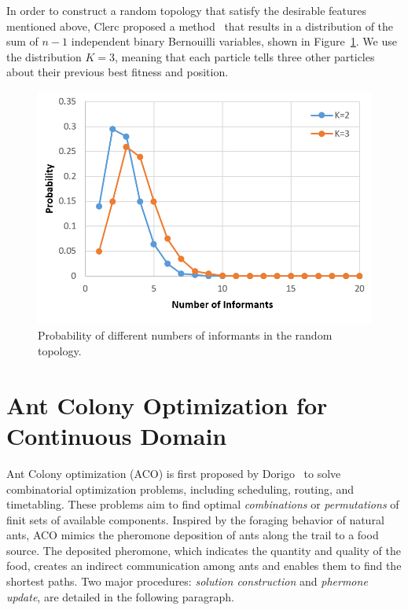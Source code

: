In order to construct a random topology that satisfy the desirable features mentioned above,
Clerc proposed a method~\cite{Clerc:2007:randomTopology} that results in 
a distribution of the sum of $n-1$ independent binary Bernouilli variables, shown in Figure~\ref{fig:SPSO_prob_informant}.
We use the distribution $K=3$, meaning that each particle tells three other particles about their previous best fitness and position.
\begin{figure}[!t] \centering
\includegraphics[width=5in]{SPSO_prob_informant}
\caption{Probability of different numbers of informants in the random topology.}\label{fig:SPSO_prob_informant}
\end{figure} 








\section{Ant Colony Optimization for Continuous Domain}


Ant Colony optimization (ACO) is first proposed by Dorigo~\cite{Dorigo:1999:ACO}
to solve combinatorial optimization problems, including scheduling, routing, and timetabling.
These problems aim to find optimal \textit{combinations} or \textit{permutations} of finit sets of available components.
Inspired by the foraging behavior of natural ants, ACO mimics the pheromone deposition of ants along the trail to a food source.
The deposited pheromone, which indicates the quantity and quality of the food, 
creates an indirect communication among ants and enables them to find the shortest paths.
Two major procedures: \textit{solution construction} and \textit{phermone update}, are detailed in the following paragraph.

